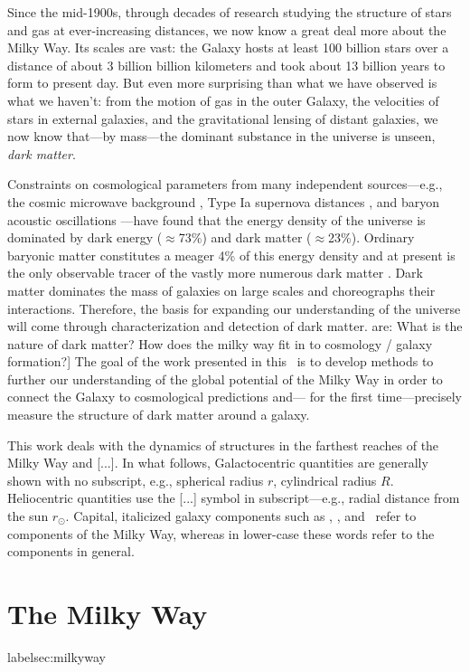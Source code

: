 Since the mid-1900s, through decades of research studying the structure of stars
and gas at ever-increasing distances, we now know a great deal more about the
Milky Way. Its scales are vast: the Galaxy hosts at least 100 billion stars over
a distance of about 3 billion billion kilometers and took about 13 billion years
to form to present day. But even more surprising than what we have observed is
what we haven't: from the motion of gas in the outer Galaxy, the velocities of
stars in external galaxies, and the gravitational lensing of distant galaxies,
we now know that---by mass---the dominant substance in the universe is unseen,
\emph{dark matter}.

Constraints on cosmological parameters from many independent sources---e.g., the
cosmic microwave background \citep{planck15}, Type Ia supernova distances
\citep{riess98, perlmutter99}, and baryon acoustic oscillations
\citep{eisenstein05}---have found that the energy density of the universe is
dominated by dark energy ($\approx$73\%) and dark matter ($\approx$23\%).
Ordinary baryonic matter constitutes a meager 4\% of this energy density and at
present is the only observable tracer of the vastly more numerous dark matter
\citep[though the search for the dark matter particle is
underway;][]{aprile11,luxdm12}. Dark matter dominates the mass of galaxies on
large scales and choreographs their interactions. Therefore, the basis for
expanding our understanding of the universe will come through characterization
and detection of dark matter. %
are: What is the nature of dark matter? How does the milky way fit in to
cosmology / galaxy formation?] The goal of the work presented in this \article\
is to develop methods to further our understanding of the global potential of
the Milky Way in order to connect the Galaxy to cosmological predictions and---
for the first time---precisely measure the structure of dark matter around a
galaxy.

This work deals with the dynamics of structures in the farthest reaches of the
Milky Way and [...]. In what follows, Galactocentric quantities are generally
shown with no subscript, e.g., spherical radius $r$, cylindrical radius $R$.
Heliocentric quantities use the [...] symbol in subscript---e.g., radial
distance from the sun $r_\odot$. Capital, italicized galaxy components such as
\mwdisk, \mwbulge, and \mwhalo\ refer to components of the Milky Way, whereas in
lower-case these words refer to the components in general.

\section{The Milky Way}label{sec:milkyway}

